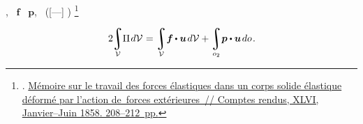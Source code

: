
,
~$\bm{f}$
~$\bm{p}$,
~([---] )
\footnote{%
%
%
.
\href{https://gallica.bnf.fr/ark:/12148/bpt6k3003h/f208.image}{M\'{e}moire sur le travail des forces \'{e}lastiques dans un corps solide \'{e}lastique d\'{e}form\'{e} par l’action de~forces ext\'{e}rieures~//
Comptes rendus, XLVI, Janvier--Juin 1858. 208\hbox{--}212~pp.}
}\hspace{-0.4ex}

\nopagebreak\vspace{-0.1em}\begin{equation}\label{clapeyron:elasticitytheorem}
2 \hspace{-0.2em}
\integral\displaylimits_{\mathcal{V}} \hspace{-0.5ex} \Pi \hspace{0.2ex} d\mathcal{V} \hspace{.12ex} =
\integral\displaylimits_{\mathcal{V}} \hspace{-0.4ex} \bm{f} \hspace{-0.1ex} \dotp \bm{u} \hspace{.25ex} d\mathcal{V} +
\integral\displaylimits_{o_2} \hspace{-0.4ex} \bm{p} \dotp \bm{u} \hspace{.25ex} do \hspace{.2ex} .
\end{equation}

